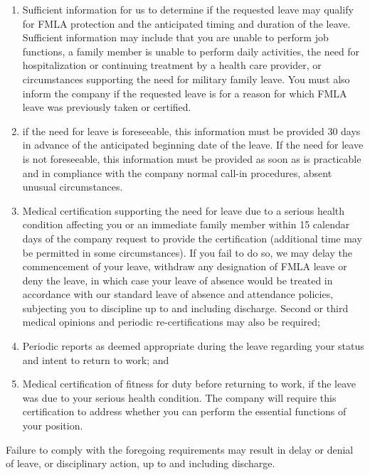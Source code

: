 \begin{enumerate} 	\item Sufficient information for us to determine if the 	requested leave may qualify for FMLA protection 	and the anticipated timing and duration of the 	leave. Sufficient information may include that 	you are unable to perform job functions, a family 	member is unable to perform daily activities, the 	need for hospitalization or continuing treatment 	by a health care provider, or circumstances 	supporting the need for military family leave. 	You must also inform the company if the 	requested leave is for a reason for which FMLA 	leave was previously taken or certified.
	
	\item if the need for leave is foreseeable, this 	information must be provided 30 days in 	advance of the anticipated beginning date of the 	leave. If the need for leave is not foreseeable, 	this information must be provided as soon as is 	practicable and in compliance with the company 	normal call-in procedures, absent unusual 	circumstances.
	
	\item Medical certification supporting the need for 	leave due to a serious health condition affecting 	you or an immediate family member within 15 	calendar days of the company request to 	provide the certification (additional time may be 	permitted in some circumstances). If you fail to 	do so, we may delay the commencement of your 	leave, withdraw any designation of FMLA leave 	or deny the leave, in which case your leave of 	absence would be treated in accordance with 	our standard leave of absence and attendance 	policies, subjecting you to discipline up to and 	including discharge. Second or third medical 	opinions and periodic re-certifications may also 	be required;
	
	\item Periodic reports as deemed appropriate during 	the leave regarding your status and intent to 	return to work; and
	
	\item Medical certification of fitness for duty before 	returning to work, if the leave was due to your 	serious health condition. The company will 	require this certification to address whether you 	can perform the essential functions of your 	position. \end{enumerate}

Failure to comply with the foregoing requirements may result in delay or denial of leave, or disciplinary action, up to and including discharge.

